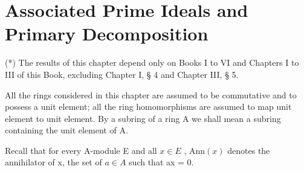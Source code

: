 \chapter{Associated Prime Ideals and Primary Decomposition}

(*) The results of this chapter depend only on Books I to VI and Chapters I to III of this Book, excluding Chapter I, § 4 and Chapter III, § 5.

All the rings considered in this chapter are assumed to be commutative and to possess a unit element; all the ring homomorphisms are assumed to map unit element to unit element. By a subring of a ring A we shall mean a subring containing the unit element of A.

Recall that for every A-module E and all \(x \in E\) , \(\text{Ann}(x)\) denotes the annihilator of x, the set of \(a \in A\) such that ax = 0.

